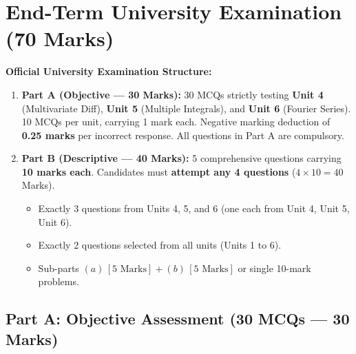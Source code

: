 \section{End-Term University Examination (70 Marks)}


\noindent
\textbf{Official University Examination Structure:}
\begin{enumerate}[topsep=2pt,itemsep=1pt]
    \item \textbf{Part A (Objective --- 30 Marks):} 30 MCQs strictly testing \textbf{Unit 4} (Multivariate Diff), \textbf{Unit 5} (Multiple Integrals), and \textbf{Unit 6} (Fourier Series). 10 MCQs per unit, carrying 1 mark each. Negative marking deduction of \textbf{0.25 marks} per incorrect response. All questions in Part A are compulsory.
    \item \textbf{Part B (Descriptive --- 40 Marks):} 5 comprehensive questions carrying \textbf{10 marks each}. Candidates must \textbf{attempt any 4 questions} ($4 \times 10 = 40$ Marks).
    \begin{itemize}
        \item Exactly 3 questions from Units 4, 5, and 6 (one each from Unit 4, Unit 5, Unit 6).
        \item Exactly 2 questions selected from all units (Units 1 to 6).
        \item Sub-parts $(a)\,[5\text{ Marks}] + (b)\,[5\text{ Marks}]$ or single 10-mark problems.
    \end{itemize}
\end{enumerate}
\vspace{3mm}

\subsection*{Part A: Objective Assessment (30 MCQs --- 30 Marks)}

